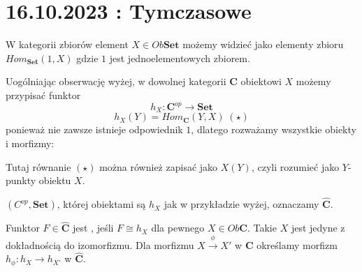 \section{16.10.2023 : Tymczasowe}

\begin{example}
  \item W kategorii zbiorów element $X\in Ob\mathbf{Set}$ możemy widzieć jako elementy zbioru $Hom_{\mathbf{Set}}(1,X)$ gdzie $1$ jest jednoelementowych zbiorem.

  \item Uogólniając obserwację wyżej, w dowolnej kategorii $\mathbf{C}$ obiektowi $X$ możemy przypisać funktor 
    $$h_X:\mathbf{C}^{op}\to \mathbf{Set}$$
    $$h_X(Y)=Hom_{\mathbf{C}}(Y,X) \; (\star)$$
    ponieważ nie zawsze istnieje odpowiednik $1$, dlatego rozważamy wszystkie obiekty i morfizmy:
    
    \begin{center}\end{center}

    Tutaj równanie $(\star)$ można również zapisać jako $X(Y)$, czyli rozumieć jako $Y$-punkty obiektu $X$.
\end{example}

\begin{definition}
   $(C^{op},\mathbf{Set})$, której obiektami są $h_X$ jak w przykładzie wyżej, oznaczamy $\hat{\mathbf{C}}$. 

  Funktor $F\in\hat{\mathbf{C}}$ jest , jeśli $F\cong h_X$ dla pewnego $X\in Ob\mathbf{C}$. Takie $X$ jest jedyne z dokładnością do izomorfizmu. Dla morfizmu $X\xrightarrow{\phi} X'$ w $\mathbf{C}$ określamy morfizm $h_\phi:h_X\to h_{X'}$ w $\mathbf{\hat{C}}$.

  \begin{center}\end{center}
\end{definition}

